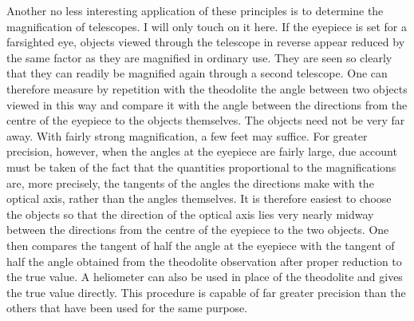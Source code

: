 Another no less interesting application of these principles is to determine the magnification of telescopes. I will only touch on it here. If the eyepiece is set for a farsighted eye, objects viewed through the telescope in reverse appear reduced by the same factor as they are magnified in ordinary use. They are seen so clearly that they can readily be magnified again through a second telescope. One can therefore measure by repetition with the theodolite the angle between two objects viewed in this way and compare it with the angle between the directions from the centre of the eyepiece to the objects themselves. The objects need not be very far away. With fairly strong magnification, a few feet may suffice. For greater precision, however, when the angles at the eyepiece are fairly large, due account must be taken of the fact that the quantities proportional to the magnifications are, more precisely, the tangents of the angles the directions make with the optical axis, rather than the angles themselves. It is therefore easiest to choose the objects so that the direction of the optical axis lies very nearly midway between the directions from the centre of the eyepiece to the two objects. One then compares the tangent of half the angle at the eyepiece with the tangent of half the angle obtained from the theodolite observation after proper reduction to the true value. A heliometer can also be used in place of the theodolite and gives the true value directly.
This procedure is capable of far greater precision than the others that have been used for the same purpose.
